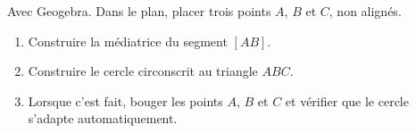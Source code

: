 
\begin{exercice}\label{exosmath-0961}

    Avec Geogebra. Dans le plan, placer trois points \( A\), \( B\) et \( C\), non alignés.
    \begin{enumerate}
        \item
            Construire la médiatrice du segment \( [AB]\).
        \item
            Construire le cercle circonscrit au triangle \( ABC\).
        \item
            Lorsque c'est fait, bouger les points \( A\), \( B\) et \( C\) et vérifier que le cercle s'adapte automatiquement.
    \end{enumerate}

\end{exercice}
